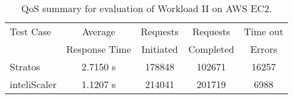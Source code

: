 \begin{table}[h!]
\centering
\caption{QoS summary for evaluation of Workload II on AWS EC2.}
\label{table:analysis_qos_workload_5}
\begin{tabular}{|l|c|c|c|c|}
\hline

Test Case & Average & Requests & Requests & Time out  \\
& Response Time & Initiated & Completed & Errors \\ \hline

Stratos & 2.7150 s & 178848 & 102671 & 16257\\ \hline

inteliScaler & 1.1207 s & 214041 & 201719 & 6988\\ \hline

\end{tabular}
\end{table}